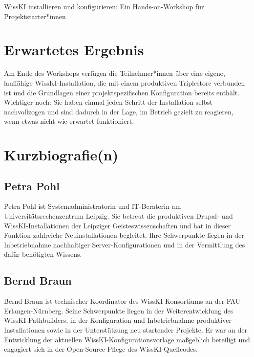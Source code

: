\begin{beitrag}{WissKI installieren und konfigurieren: Ein Hands-on-Workshop für Projektstarter*innen}
\section{Erwartetes Ergebnis}
Am Ende des Workshops verfügen die Teilnehmer*innen über eine eigene, lauffähige WissKI-Installation, die mit einem produktiven Triplestore verbunden ist und die Grundlagen einer projektspezifischen Konfiguration bereits enthält. Wichtiger noch: Sie haben einmal jeden Schritt der Installation selbst nachvollzogen und sind dadurch in der Lage, im Betrieb gezielt zu reagieren, wenn etwas nicht wie erwartet funktioniert.

\end{beitrag}

\section*{Kurzbiografie(n)}

\subsection*{Petra Pohl}
Petra Pohl ist Systemadministratorin und IT-Beraterin am Universitätsrechenzentrum Leipzig. Sie betreut die produktiven Drupal- und WissKI-Installationen der Leipziger Geisteswissenschaften und hat in dieser Funktion zahlreiche Neuinstallationen begleitet. Ihre Schwerpunkte liegen in der Inbetriebnahme nachhaltiger Server-Konfigurationen und in der Vermittlung des dafür benötigten Wissens.

\subsection*{Bernd Braun}
Bernd Braun ist technischer Koordinator des WissKI-Konsortiums an der FAU Erlangen-Nürnberg. Seine Schwerpunkte liegen in der Weiterentwicklung des WissKI-Pathbuilders, in der Konfiguration und Inbetriebnahme produktiver Installationen sowie in der Unterstützung neu startender Projekte. Er war an der Entwicklung der aktuellen WissKI-Konfigurationsvorlage maßgeblich beteiligt und engagiert sich in der Open-Source-Pflege des WissKI-Quellcodes.
